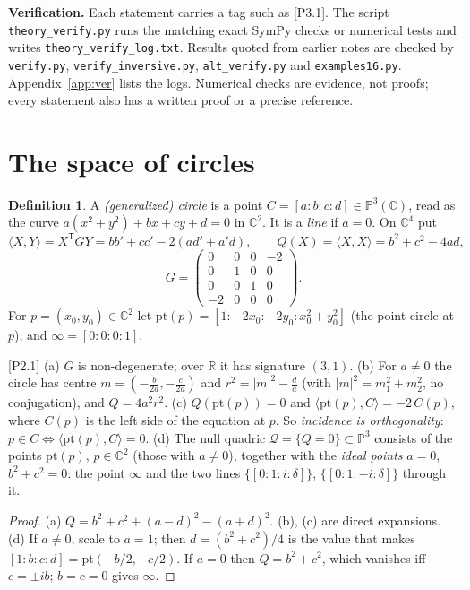 \documentclass[11pt]{article}
\theoremstyle{definition}\newtheorem{definition}[theorem]{Definition}\newtheorem{remark}[theorem]{Remark}\newtheorem{example}[theorem]{Example}
\newcommand{\C}{\mathbb{C}}\newcommand{\R}{\mathbb{R}}\newcommand{\PP}{\mathbb{P}}
\newcommand{\ip}[2]{\langle #1,#2\rangle}\newcommand{\pt}{\mathrm{pt}}\newcommand{\Qd}{\mathcal{Q}}
\newcommand{\chk}[1]{\hfill{\footnotesize\textsf{[#1]}}}
\begin{document}
\textbf{Verification.} Each statement carries a tag such as \textsf{[P3.1]}. The script \texttt{theory\_verify.py} runs the matching exact SymPy checks or numerical tests and writes \texttt{theory\_verify\_log.txt}. Results quoted from earlier notes are checked by \texttt{verify.py}, \texttt{verify\_inversive.py}, \texttt{alt\_verify.py} and \texttt{examples16.py}. Appendix~\ref{app:ver} lists the logs. Numerical checks are evidence, not proofs; every statement also has a written proof or a precise reference.

\section{The space of circles}\label{sec:space}
\begin{definition}
A \emph{(generalized) circle} is a point $C=[a:b:c:d]\in\PP^3(\C)$, read as the curve $a(x^2+y^2)+bx+cy+d=0$ in $\C^2$. It is a \emph{line} if $a=0$. On $\C^4$ put
\[ \ip XY=X^{\mathsf T}GY=bb'+cc'-2(ad'+a'd),\qquad Q(X)=\ip XX=b^2+c^2-4ad,\]\[ G=\begin{pmatrix}0&0&0&-2\\0&1&0&0\\0&0&1&0\\-2&0&0&0\end{pmatrix}. \]
For $p=(x_0,y_0)\in\C^2$ let $\pt(p)=[1:-2x_0:-2y_0:x_0^2+y_0^2]$ (the point-circle at $p$), and $\infty=[0:0:0:1]$.
\end{definition}

\begin{proposition}\label{prop:form}\chk{P2.1}
(a) $G$ is non-degenerate; over $\R$ it has signature $(3,1)$.
(b) For $a\ne0$ the circle has centre $m=(-\tfrac b{2a},-\tfrac c{2a})$ and $r^2=|m|^2-\tfrac da$ (with $|m|^2=m_1^2+m_2^2$, no conjugation), and $Q=4a^2r^2$.
(c) $Q(\pt(p))=0$ and $\ip{\pt(p)}{C}=-2\,C(p)$, where $C(p)$ is the left side of the equation at $p$. So \emph{incidence is orthogonality}: $p\in C\iff\ip{\pt(p)}C=0$.
(d) The null quadric $\Qd=\{Q=0\}\subset\PP^3$ consists of the points $\pt(p)$, $p\in\C^2$ (those with $a\neq0$), together with the \emph{ideal points} $a=0$, $b^2+c^2=0$: the point $\infty$ and the two lines $\{[0:1:i:\delta]\}$, $\{[0:1:-i:\delta]\}$ through it.
\end{proposition}
\begin{proof}
(a) $Q=b^2+c^2+(a-d)^2-(a+d)^2$. (b), (c) are direct expansions. (d) If $a\neq0$, scale to $a=1$; then $d=(b^2+c^2)/4$ is the value that makes $[1:b:c:d]=\pt(-b/2,-c/2)$. If $a=0$ then $Q=b^2+c^2$, which vanishes iff $c=\pm ib$; $b=c=0$ gives $\infty$.
\end{proof}
\end{document}

